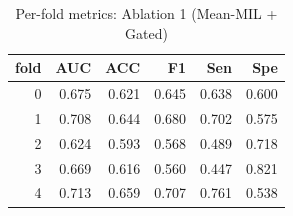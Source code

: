 \begin{table}[H]
\centering
\small
\caption{Per-fold metrics: Ablation 1 (Mean-MIL + Gated)}
\label{tab:ablation1_mean_mil_gated_per_fold}
\begin{tabular}{rrrrrr}
\toprule
fold & AUC & ACC & F1 & Sen & Spe \\
\midrule
0 & 0.675 & 0.621 & 0.645 & 0.638 & 0.600 \\
1 & 0.708 & 0.644 & 0.680 & 0.702 & 0.575 \\
2 & 0.624 & 0.593 & 0.568 & 0.489 & 0.718 \\
3 & 0.669 & 0.616 & 0.560 & 0.447 & 0.821 \\
4 & 0.713 & 0.659 & 0.707 & 0.761 & 0.538 \\
\bottomrule
\end{tabular}
\end{table}
